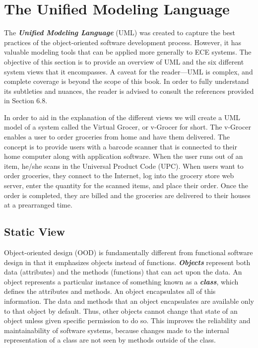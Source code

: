 \section{The Unified Modeling Language}
\label{section:the-unified-modeling-language}

The \emph{\textbf{Unified Modeling Language}} (UML) was created to
capture the best practices of the object-oriented software development
process. However, it has valuable modeling tools that can be applied
more generally to ECE systems. The objective of this section is to
provide an overview of UML and the six different system views that it
encompasses. A caveat for the reader---UML is complex, and complete
coverage is beyond the scope of this book. In order to fully understand
its subtleties and nuances, the reader is advised to consult the
references provided in Section 6.8.

In order to aid in the explanation of the different views we will create
a UML model of a system called the Virtual Grocer, or v-Grocer for
short. The v-Grocer enables a user to order groceries from home and have
them delivered. The concept is to provide users with a barcode scanner
that is connected to their home computer along with application
software. When the user runs out of an item, he/she scans in the
Universal Product Code (UPC). When users want to order groceries, they
connect to the Internet, log into the grocery store web server, enter
the quantity for the scanned items, and place their order. Once the
order is completed, they are billed and the groceries are delivered to
their houses at a prearranged time.

\subsection{Static View}
\label{subsection:static-view}

Object-oriented design (OOD) is fundamentally different from functional
software design in that it emphasizes objects instead of functions.
\emph{\textbf{Objects}} represent both data (attributes) and the methods
(functions) that can act upon the data. An object represents a
particular instance of something known as a \emph{\textbf{class}}, which
defines the attributes and methods. An object encapsulates all of this
information. The data and methods that an object encapsulates are
available only to that object by default. Thus, other objects cannot
change that state of an object unless given specific permission to do
so. This improves the reliability and maintainability of software
systems, because changes made to the internal representation of a class
are not seen by methods outside of the class.

